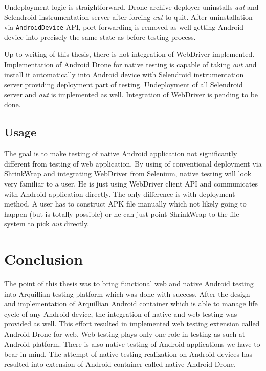 \documentclass[12pt,final,oneside]{fithesis}
\begin{document}
Undeployment logic is straightforward. Drone archive deployer uninstalls \textit{aut} and Selendroid instrumentation server after forcing \textit{aut} to quit. After uninstallation via \texttt{AndroidDevice} API, port forwarding is removed as well getting Android device into precisely the same state as before testing process.

Up to writing of this thesis, there is not integration of WebDriver implemented. Implementation of Android Drone for native testing is capable of taking \textit{aut} and install it automatically into Android device with Selendroid instrumentation server providing deployment part of testing. Undeployment of all Selendroid server and \textit{aut} is implemented as well. Integration of WebDriver is pending to be done.

	\section{Usage}	

The goal is to make testing of native Android application not significantly different from testing of web application. By using of conventional deployment via ShrinkWrap and integrating WebDriver from Selenium, native testing will look very familiar to a user. He is just using WebDriver client API and communicates with Android application directly. The only difference is with deployment method. A user has to construct APK file manually which not likely going to happen (but is totally possible) or he can just point ShrinkWrap to the file system to pick \textit{aut} directly.




\chapter{Conclusion}

The point of this thesis was to bring functional web and native Android testing into Arquillian testing platform which was done with success. After the design and implementation of Arquillian Android container which is able to manage life cycle of any Android device, the integration of native and web testing was provided as well. This effort resulted in implemented web testing extension called Android Drone for web. Web testing plays only one role in testing as such at Android platform. There is also native testing of Android applications we have to bear in mind. The attempt of native testing realization on Android devices has resulted into extension of Android container called native Android Drone.
\end{document}
